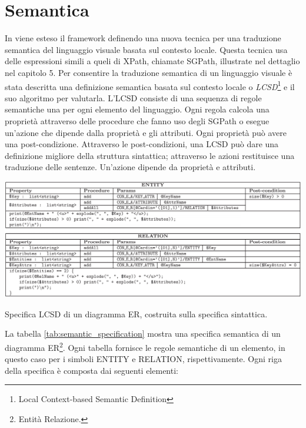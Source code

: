     \section{Semantica}
        \label{sec:semantica}
        In \cite{localcontext} viene esteso il framework definendo una nuova tecnica per una traduzione semantica del linguaggio visuale basata sul contesto locale. Questa tecnica usa delle espressioni simili a queli di XPath, chiamate SGPath, illustrate nel dettaglio nel capitolo 5.
        \newline
        Per consentire la traduzione semantica di un linguaggio visuale è stata descritta una definizione semantica basata sul contesto locale o \textit{LCSD}\footnote{Local Context-based Semantic Definition} e il suo algoritmo per valutarla. L'LCSD consiste di una sequenza di regole semantiche una per ogni elemento del linguaggio. Ogni regola calcola una proprietà attraverso delle procedure che fanno uso degli SGPath o esegue un'azione che dipende dalla proprietà e gli attributi. Ogni proprietà può avere una post-condizione.
        \newline
        Attraverso le post-condizioni, una LCSD può dare una definizione migliore della struttura sintattica; attraverso le azioni restituisce una traduzione delle sentenze. Un'azione dipende da proprietà e attributi.
        \begin{table}[htbp]
            \centering
            \includegraphics[scale=0.37]{Figure/semantic_specification.PNG}
            \caption{Specifica LCSD di un diagramma ER, costruita sulla specifica sintattica.}
            \label{tab:semantic_specification}
        \end{table}
        \newline
        La tabella \ref{tab:semantic_specification} mostra una specifica semantica di un diagramma ER\footnote{Entità Relazione.}. Ogni tabella fornisce le regole semantiche di un elemento, in questo caso per i simboli ENTITY e RELATION, rispettivamente. Ogni riga della specifica è composta dai seguenti elementi:
